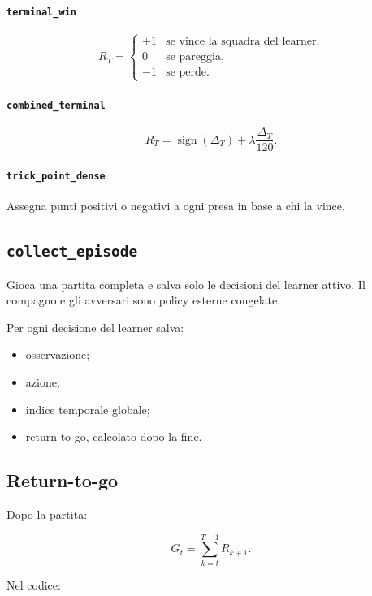\documentclass[11pt,a4paper]{article}
\begin{document}
\paragraph{\texttt{terminal\_win}}

\[
R_T =
\begin{cases}
+1 & \text{se vince la squadra del learner},\\
0 & \text{se pareggia},\\
-1 & \text{se perde}.
\end{cases}
\]

\paragraph{\texttt{combined\_terminal}}

\[
R_T =
\operatorname{sign}(\Delta_T)
+
\lambda \frac{\Delta_T}{120}.
\]

\paragraph{\texttt{trick\_point\_dense}}

Assegna punti positivi o negativi a ogni presa in base a chi la vince.

\subsection{\texttt{collect\_episode}}

Gioca una partita completa e salva solo le decisioni del learner attivo. Il
compagno e gli avversari sono policy esterne congelate.

Per ogni decisione del learner salva:

\begin{itemize}
  \item osservazione;
  \item azione;
  \item indice temporale globale;
  \item return-to-go, calcolato dopo la fine.
\end{itemize}

\subsection{Return-to-go}

Dopo la partita:

\[
G_t = \sum_{k=t}^{T-1} R_{k+1}.
\]

Nel codice:
\end{document}
